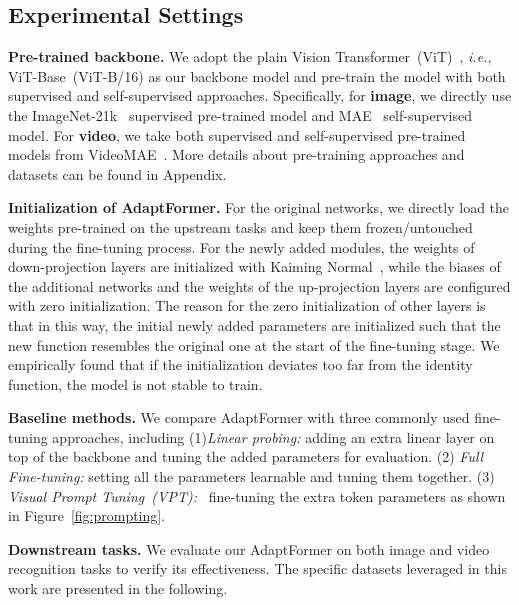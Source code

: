 \subsection{Experimental Settings}\label{Sec:exp_setting}
\textbf{Pre-trained backbone.} We adopt the plain Vision Transformer~(ViT)~\cite{dosovitskiy-2020-vit}, \emph{i.e.}, ViT-Base~(ViT-B/16) as our backbone model and pre-train the model with both supervised and self-supervised approaches. Specifically, for \textcolor{Image}{\textbf{image}}, we directly use the ImageNet-21k~\cite{deng-cvpr09-imagenet} supervised pre-trained model\footnotemark{}
and MAE~\cite{he-2021-mae} self-supervised model\footnotemark.
For \textcolor{Video}{\textbf{video}}, we take both supervised and self-supervised pre-trained models from VideoMAE~\cite{tong-2022-videomae}. More details about pre-training approaches and datasets can be found in Appendix.


\textbf{Initialization of AdaptFormer.} For the original networks, we directly load the weights pre-trained on the upstream tasks and keep them frozen/untouched during the fine-tuning process. For the newly added modules, the weights of down-projection layers are initialized with Kaiming Normal~\cite{he2015delving}, while the biases of the additional networks and the weights of the up-projection layers are configured with zero initialization. The reason for the zero initialization of other layers is that in this way, the initial newly added parameters are initialized such that the new function resembles the original one at the start of the fine-tuning stage. We empirically found that if the initialization deviates too far from the identity function, the model is not stable to train. 

\textbf{Baseline methods.} We compare AdaptFormer with three commonly used fine-tuning approaches, including (1)\emph{Linear probing:} adding an extra linear layer on top of the backbone and tuning the added parameters for evaluation. (2) \emph{Full Fine-tuning:} setting all the parameters learnable and tuning them together. (3) \emph{Visual Prompt Tuning~(VPT):}~\cite{jia-2022-vpt} fine-tuning the extra token parameters as shown in Figure~\ref{fig:prompting}.

\textbf{Downstream tasks.} We evaluate our AdaptFormer on both image and video recognition tasks to verify its effectiveness. The specific datasets leveraged in this work are presented in the following.

